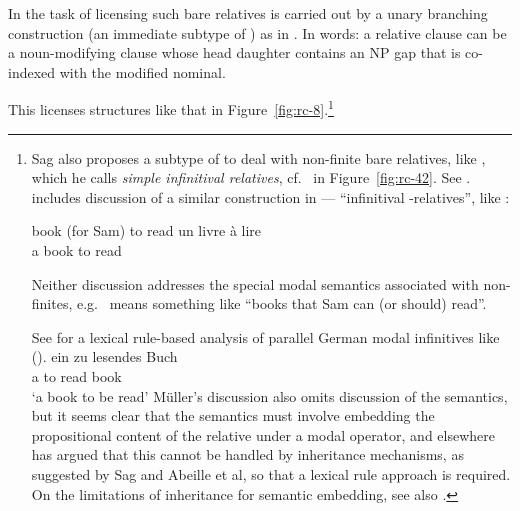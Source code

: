 \documentclass[output=paper
 	        ,biblatex
                ,babelshorthands
                ,newtxmath
                ,draftmode
                ,colorlinks, citecolor=brown
]{langscibook}
\begin{document}
In  the task of licensing such bare relatives is carried out by a unary
branching construction (an immediate subtype of ) as in
. In words: a relative clause can be a noun-modifying clause whose head daughter
contains an NP gap that is co-indexed with the modified nominal.
\begin{exe}\ex\label{x:rc-91}
\end{exe}
This licenses structures like that in Figure~\ref{fig:rc-8}.\footnote{\label{relative-clauses:fn-page-to-be-read}Sag also proposes a
  subtype of  to deal with non-finite bare relatives, like , which he calls
  \emph{simple infinitival relatives}, cf.\  in
  Figure~\ref{fig:rc-42}. See . \citet{AGMS98a} includes discussion of a
  similar construction in  --- ``infinitival -relatives'', like :
  \begin{exe}
    \ex\label{x:rc-92}book (for Sam) to read
    \ex\label{x:rc-93}\gll un livre \`{a} lire\\
            a book    to   read\\ 
  \end{exe}
  Neither discussion addresses the
  special modal semantics associated with non-finites, e.g.\ 
  means something like ``books that Sam can (or should) read''.

  See \citet[Sections~3.2.4, 3.2.7]{Mueller2002b} for a lexical rule-based analysis of parallel German
    modal infinitives like ().
  \ea 
  \gll ein zu lesendes Buch\\
       a to read book\\
  \glt `a book to be read'
  \z
  Müller’s discussion also omits discussion of the semantics, but it seems clear that the
semantics must involve embedding the propositional content of the relative under a modal
operator, and elsewhere \textcites[--872]{Mueller2006d}[--113]{MuellerLehrbuch1}[Section~4.2]{MuellerPersian} has argued that this cannot be handled by
inheritance mechanisms, as suggested by Sag and Abeille et al, so that a lexical rule approach is required.
On the limitations of inheritance for semantic embedding, see also .
} 
\end{document}
